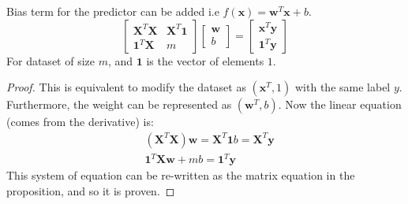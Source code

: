 \begin{proposition}
    Bias term for the predictor can be added i.e $f(\boldsymbol x) = \boldsymbol w^T\boldsymbol x + b$. 
    \begin{equation*}
        \begin{bmatrix}
            \boldsymbol X^T\boldsymbol X & \boldsymbol X^T\boldsymbol 1 \\
            \boldsymbol 1^T\boldsymbol X & m 
        \end{bmatrix}\begin{bmatrix}
            \boldsymbol w \\ b
        \end{bmatrix} = \begin{bmatrix}
            \boldsymbol x^T\boldsymbol y \\
            \boldsymbol 1^T\boldsymbol y
        \end{bmatrix}
    \end{equation*} 
    For dataset of size $m$, and $\boldsymbol 1$ is the vector of elements $1$. 
\end{proposition}
\begin{proof}
    This is equivalent to modify the dataset as $(\boldsymbol x^T, 1)$ with the same label $y$. Furthermore, the weight can be represented as $(\boldsymbol w^T, b)$. Now the linear equation (comes from the derivative) is:
    \begin{equation*}
    \begin{aligned}
        &(\boldsymbol X^T\boldsymbol X)\boldsymbol w = \boldsymbol X^T\boldsymbol 1b = \boldsymbol X^T\boldsymbol y \\
        &\boldsymbol 1^T\boldsymbol X\boldsymbol w + mb = \boldsymbol 1^T\boldsymbol y
    \end{aligned}
    \end{equation*}
    This system of equation can be re-written as the matrix equation in the proposition, and so it is proven.
\end{proof}


